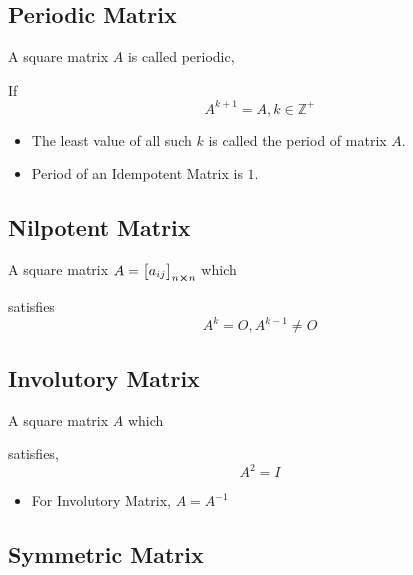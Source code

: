\documentclass{article}
\begin{document}
\subsection{Periodic Matrix}

A square matrix $A$ is called periodic,

If $$A^{k+1}=A, k \in \mathbb{Z^+} $$
\begin{itemize}

    \item  The least value of all such $k$ is called the period of matrix $A$.

    \item   Period of an Idempotent Matrix is $1$.
\end{itemize}
\subsection{Nilpotent Matrix}

A square matrix $A={\begin{bmatrix}
        a_{ij}
    \end{bmatrix}}_{n \cross n} $ which

satisfies $$A^k=O, A^{k-1} \not=O $$

\subsection{Involutory Matrix}

A square matrix $A$ which

satisfies, $$A^2=I$$
\begin{itemize}

    \item   For Involutory Matrix, $A=A^{-1}$
\end{itemize}
\subsection{Symmetric Matrix}
\end{document}
